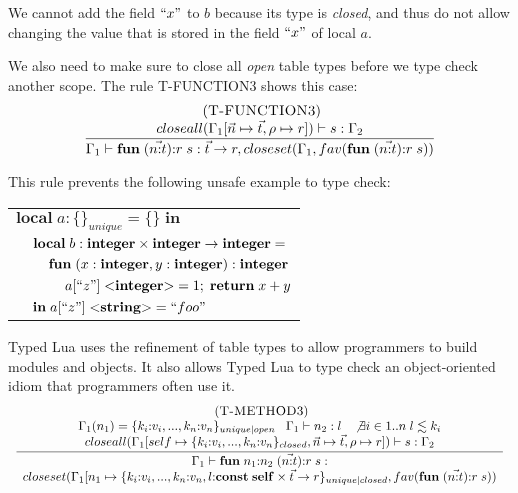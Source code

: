 We cannot add the field $``x"$ to $b$ because its type is \emph{closed},
and thus do not allow changing the value that is stored in the field $``x"$
of local $a$.

We also need to make sure to close all \emph{open} table types before we
type check another scope.
The rule \textsc{T-FUNCTION3} shows this case:
\[
\begin{array}{c}
\; (\textsc{T-FUNCTION3})\\
\dfrac{closeall(\Gamma_{1}[\vec{n} \mapsto \vec{t}, \rho \mapsto r]) \vdash s:\Gamma_{2}}
      {\Gamma_{1} \vdash \mathbf{fun} \; (\vec{n{:}t}){:}r \; s:\vec{t} \rightarrow r, closeset(\Gamma_{1}, fav(\mathbf{fun} \; (\vec{n{:}t}){:}r \; s))}
\end{array}
\]

This rule prevents the following unsafe example to type check:
\begin{center}
\begin{tabular}{llll}
\multicolumn{4}{l}{$\mathbf{local} \; a:\{\}_{unique} = \{\} \; \mathbf{in}$}\\
& \multicolumn{3}{l}{$\mathbf{local} \; b:\mathbf{integer} \times \mathbf{integer} \rightarrow \mathbf{integer} =$}\\
& & \multicolumn{2}{l}{$\mathbf{fun} \; (x:\mathbf{integer}, y:\mathbf{integer}):\mathbf{integer}$}\\
& & & \multicolumn{1}{l}{$a[``z"] \; {<}\mathbf{integer}{>} = 1; \; \mathbf{return} \; x + y$}\\
& \multicolumn{3}{l}{$\mathbf{in} \; a[``z"] \; {<}\mathbf{string}{>} = ``foo"$}
\end{tabular}
\end{center}

Typed Lua uses the refinement of table types to allow programmers to
build modules and objects.
It also allows Typed Lua to type check an object-oriented idiom that
programmers often use it.
\[
\begin{array}{c}
\; (\textsc{T-METHOD3})\\
\dfrac{\begin{array}{c}
       \Gamma_{1}(n_{1}) = \{k_{i}{:}v_{i}, ..., k_{n}{:}v_{n}\}_{unique|open} \;\;\;
       \Gamma_{1} \vdash n_{2} : l \;\;\;
       \not \exists i \in 1..n \; l \lesssim k_{i}\\
       closeall(\Gamma_{1}[self \mapsto \{k_{i}{:}v_{i}, ..., k_{n}{:}v_{n}\}_{closed}, \vec{n} \mapsto \vec{t}, \rho \mapsto r]) \vdash s:\Gamma_{2}
       \end{array}}
      {\begin{array}{c}
       \Gamma_{1} \vdash \mathbf{fun} \; n_{1}{:}n_{2} \; (\vec{n{:}t}){:}r \; s:\\
       closeset(\Gamma_{1}[n_{1} \mapsto \{k_{i}{:}v_{i}, ..., k_{n}{:}v_{n}, l{:}\mathbf{const} \; \mathbf{self} \times \vec{t} \rightarrow r\}_{unique|closed}, fav(\mathbf{fun} \; (\vec{n{:}t}){:}r \; s))
       \end{array}}
\end{array}
\]

